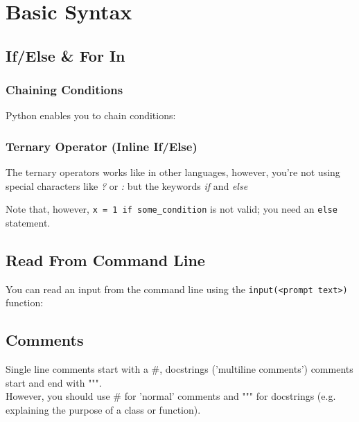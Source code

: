 \section{Basic Syntax}

    \subsection{If/Else \& For In}

        \subsubsection{Chaining Conditions}
            Python enables you to chain conditions:


        \subsubsection{Ternary Operator (Inline If/Else)}
            The ternary operators works like in other languages, however, you're not using special
            characters like \textit{?} or \textit{:} but the keywords \textit{if} and \textit{else}

            Note that, however, \texttt{x = 1 if some_condition} is not valid; you need an
            \texttt{else} statement.

    \subsection{Read From Command Line}
        You can read an input from the command line using the
        \texttt{input(<prompt text>)} function:


    \subsection{Comments}
        Single line comments start with a \#, docstrings ('multiline comments') comments start and
        end with """. \\
        However, you should use \# for 'normal' comments and """ for docstrings (e.g. explaining the
        purpose of a class or function).

